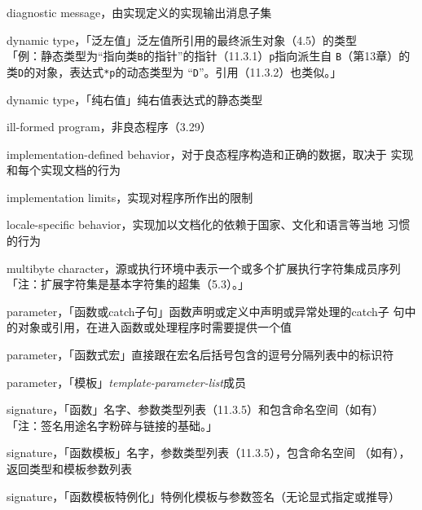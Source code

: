 \noindent diagnostic message，由实现定义的实现输出消息子集

\noindent dynamic type，「泛左值」泛左值所引用的最终派生对象（4.5）的类型 \\
「例：静态类型为``指向类\texttt{B}的指针''的指针（11.3.1）\texttt{p}指向派生自
\texttt{B}（第13章）的类\texttt{D}的对象，表达式\texttt{*p}的动态类型为
``\texttt{D}''。引用（11.3.2）也类似。」

\noindent dynamic type，「纯右值」纯右值表达式的静态类型

\noindent ill-formed program，非良态程序（3.29）

\noindent implementation-defined behavior，对于良态程序构造和正确的数据，取决于
实现和每个实现文档的行为

\noindent implementation limits，实现对程序所作出的限制

\noindent locale-specific behavior，实现加以文档化的依赖于国家、文化和语言等当地
习惯的行为

\noindent multibyte character，源或执行环境中表示一个或多个扩展执行字符集成员序列
「注：扩展字符集是基本字符集的超集（5.3）。」

\noindent parameter，「函数或catch子句」函数声明或定义中声明或异常处理的catch子
句中的对象或引用，在进入函数或处理程序时需要提供一个值

\noindent parameter，「函数式宏」直接跟在宏名后括号包含的逗号分隔列表中的标识符

\noindent parameter，「模板」\textit{template-parameter-list}成员

\noindent signature，「函数」名字、参数类型列表（11.3.5）和包含命名空间（如有）\\
「注：签名用途名字粉碎与链接的基础。」

\noindent signature，「函数模板」名字，参数类型列表（11.3.5），包含命名空间
（如有），返回类型和模板参数列表

\noindent signature，「函数模板特例化」特例化模板与参数签名（无论显式指定或推导）

